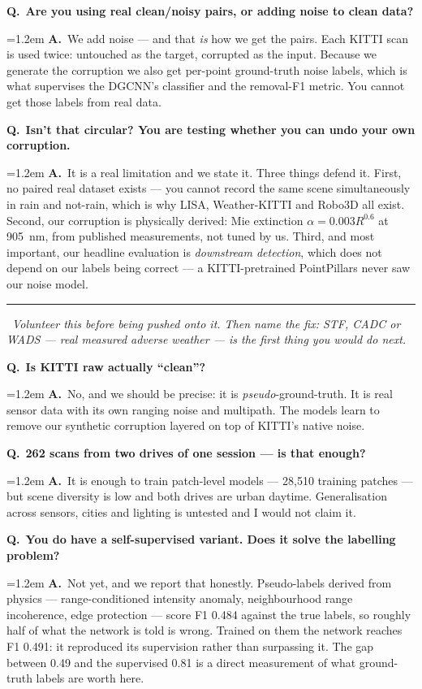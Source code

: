 \documentclass[11pt,a4paper]{article}
\newcommand{\Q}[1]{\medskip\noindent\textcolor{qcol}{\textbf{Q.}}\ \textbf{#1}\par\nopagebreak}
\newcommand{\A}[1]{\noindent\hangindent=1.2em\hangafter=0 \textcolor{inkcol}{\textbf{A.}}\ #1\par}
\newcommand{\danger}[1]{\medskip\noindent\textcolor{warncol}{\rule{2.5pt}{9pt}}\ \textit{\textcolor{warncol}{#1}}\par}
\begin{document}
\Q{Are you using real clean/noisy pairs, or adding noise to clean data?}
\A{We add noise --- and that \emph{is} how we get the pairs. Each KITTI scan
is used twice: untouched as the target, corrupted as the input. Because we
generate the corruption we also get per-point ground-truth noise labels,
which is what supervises the DGCNN's classifier and the removal-F1 metric.
You cannot get those labels from real data.}

\Q{Isn't that circular? You are testing whether you can undo your own corruption.}
\A{It is a real limitation and we state it. Three things defend it. First, no
paired real dataset exists --- you cannot record the same scene
simultaneously in rain and not-rain, which is why LISA, Weather-KITTI and
Robo3D all exist. Second, our corruption is physically derived: Mie
extinction $\alpha = 0.003R^{0.6}$ at 905~nm, from published measurements,
not tuned by us. Third, and most important, our headline evaluation is
\emph{downstream detection}, which does not depend on our labels being
correct --- a KITTI-pretrained PointPillars never saw our noise model.}

\danger{Volunteer this before being pushed onto it. Then name the fix: STF,
CADC or WADS --- real measured adverse weather --- is the first thing you
would do next.}

\Q{Is KITTI raw actually ``clean''?}
\A{No, and we should be precise: it is \emph{pseudo}-ground-truth. It is real
sensor data with its own ranging noise and multipath. The models learn to
remove our synthetic corruption layered on top of KITTI's native noise.}

\Q{262 scans from two drives of one session --- is that enough?}
\A{It is enough to train patch-level models --- 28{,}510 training patches ---
but scene diversity is low and both drives are urban daytime. Generalisation
across sensors, cities and lighting is untested and I would not claim it.}

\Q{You do have a self-supervised variant. Does it solve the labelling problem?}
\A{Not yet, and we report that honestly. Pseudo-labels derived from physics
--- range-conditioned intensity anomaly, neighbourhood range incoherence,
edge protection --- score F1 0.484 against the true labels, so roughly half
of what the network is told is wrong. Trained on them the network reaches
F1 0.491: it reproduced its supervision rather than surpassing it. The gap
between 0.49 and the supervised 0.81 is a direct measurement of what
ground-truth labels are worth here.}
\end{document}

